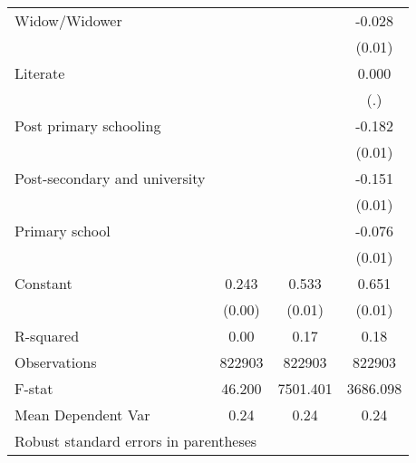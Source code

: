 {\begin{tabular}{l*{3}{c}}
Widow/Widower       &                     &                     &      -0.028\sym{**} \\
                    &                     &                     &      (0.01)         \\
Literate            &                     &                     &       0.000         \\
                    &                     &                     &         (.)         \\
Post primary schooling&                     &                     &      -0.182\sym{***}\\
                    &                     &                     &      (0.01)         \\
Post-secondary and university&                     &                     &      -0.151\sym{***}\\
                    &                     &                     &      (0.01)         \\
Primary school      &                     &                     &      -0.076\sym{***}\\
                    &                     &                     &      (0.01)         \\
Constant            &       0.243\sym{***}&       0.533\sym{***}&       0.651\sym{***}\\
                    &      (0.00)         &      (0.01)         &      (0.01)         \\
\hline
R-squared           &        0.00         &        0.17         &        0.18         \\
Observations        &      822903         &      822903         &      822903         \\
F-stat              &      46.200         &    7501.401         &    3686.098         \\
Mean Dependent Var  &        0.24         &        0.24         &        0.24         \\
\hline\hline
\multicolumn{4}{l}{\footnotesize Robust standard errors in parentheses}\\
\end{tabular}
}
